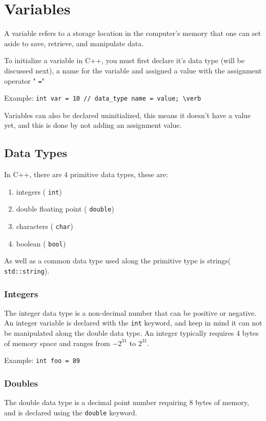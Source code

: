 \chapter{Variables}
\par A variable refers to a storage location in the computer’s memory that one can set aside to save, retrieve, and manipulate data.

\par To initialize a variable in C++, you must first declare it's data type (will be discussed next), a name for the variable 
and assigned a value with the assignment operator " \verb!=!"

\noindent Example:  \verb!int var = 10 // data_type name = value; \verb!

\par Variables can also be declared uninitialized, this means it doesn't have a value yet, and this is done by not adding an 
assignment value.

\section{Data Types}
\par In C++, there are 4 primitive data types, these are: 

\begin{enumerate}
    \item integers ( \verb!int!)
    \item double floating point ( \verb!double!)
    \item characters ( \verb!char!)
    \item boolean ( \verb!bool!)
\end{enumerate}
As well as a common data type used along the primitive type is strings( \verb!std::string!). 

\subsection{Integers}
\par The integer data type is a non-decimal number that can be positive or negative. An integer variable 
is declared with the \verb!int! keyword, and keep in mind it can not be manipulated along the double data type. 
An integer typically requires 4 bytes of memory space and ranges from $-2^{31}$ to $2^{31}$.  

\noindent Example: \verb!int foo = 89!

\subsection{Doubles}
\par The double data type is a decimal point number requiring 8 bytes of memory, and is declared using 
the  \verb!double! keyword.  

